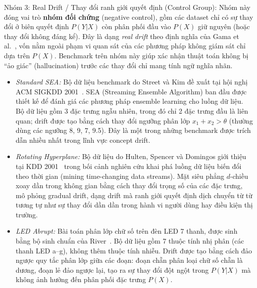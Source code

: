 Nhóm 3: Real Drift / Thay đổi ranh giới quyết định (Control Group): Nhóm này đóng vai trò \textbf{nhóm đối chứng} (negative control), gồm các dataset chỉ có sự thay đổi ở biên quyết định $P(Y|X)$ còn phân phối đầu vào $P(X)$ giữ nguyên (hoặc thay đổi không đáng kể). Đây là dạng \textit{real drift} theo định nghĩa của Gama et al.~\cite{gama2014survey}, vốn nằm ngoài phạm vi quan sát của các phương pháp không giám sát chỉ dựa trên $P(X)$. Benchmark trên nhóm này giúp xác nhận thuật toán không bị ``ảo giác'' (hallucination) trước các thay đổi chỉ mang tính ngữ nghĩa nhãn.
\begin{itemize}
	\item \textit{Standard SEA:} Bộ dữ liệu benchmark do Street và Kim đề xuất tại hội nghị ACM SIGKDD 2001~\cite{street2001streaming}. SEA (Streaming Ensemble Algorithm) ban đầu được thiết kế để đánh giá các phương pháp ensemble learning cho luồng dữ liệu. Bộ dữ liệu gồm 3 đặc trưng ngẫu nhiên, trong đó chỉ 2 đặc trưng đầu là liên quan; drift được tạo bằng cách thay đổi ngưỡng phân lớp $x_1 + x_2 > \theta$ (thường dùng các ngưỡng 8, 9, 7, 9.5). Đây là một trong những benchmark được trích dẫn nhiều nhất trong lĩnh vực concept drift.

	\item \textit{Rotating Hyperplane:} Bộ dữ liệu do Hulten, Spencer và Domingos giới thiệu tại KDD 2001~\cite{hulten2001mining} trong bối cảnh nghiên cứu khai phá luồng dữ liệu biến đổi theo thời gian (mining time-changing data streams). Mặt siêu phẳng $d$-chiều xoay dần trong không gian bằng cách thay đổi trọng số của các đặc trưng, mô phỏng gradual drift, dạng drift mà ranh giới quyết định dịch chuyển từ từ tương tự như sự thay đổi dần dần trong hành vi người dùng hay điều kiện thị trường.

	\item \textit{LED Abrupt:} Bài toán phân lớp chữ số trên đèn LED 7 thanh, được sinh bằng bộ sinh chuẩn của River~\cite{river2021}. Bộ dữ liệu gồm 7 thuộc tính nhị phân (các thanh LED a--g), không thêm thuộc tính nhiễu. Drift được tạo bằng cách đảo ngược quy tắc phân lớp giữa các đoạn: đoạn chẵn phân loại chữ số chẵn là dương, đoạn lẻ đảo ngược lại, tạo ra sự thay đổi đột ngột trong $P(Y|X)$ mà không ảnh hưởng đến phân phối đặc trưng $P(X)$.
\end{itemize}

